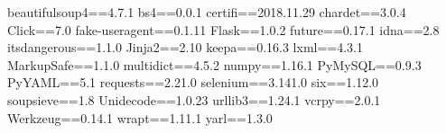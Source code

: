 beautifulsoup4==4.7.1
bs4==0.0.1
certifi==2018.11.29
chardet==3.0.4
Click==7.0
fake-useragent==0.1.11
Flask==1.0.2
future==0.17.1
idna==2.8
itsdangerous==1.1.0
Jinja2==2.10
keepa==0.16.3
lxml==4.3.1
MarkupSafe==1.1.0
multidict==4.5.2
numpy==1.16.1
PyMySQL==0.9.3
PyYAML==5.1
requests==2.21.0
selenium==3.141.0
six==1.12.0
soupsieve==1.8
Unidecode==1.0.23
urllib3==1.24.1
vcrpy==2.0.1
Werkzeug==0.14.1
wrapt==1.11.1
yarl==1.3.0
